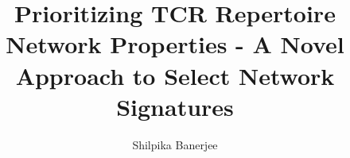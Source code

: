 \documentclass{sfsuthesis}
\begin{document}
\title{Prioritizing TCR Repertoire Network Properties - A Novel Approach to Select Network Signatures}
\author{Shilpika Banerjee}


\maketitle
\copyrightpage
\approvalpage




\begin{frontmatter}

%





\pagestyle{headings}
\begin{KeepFromToc}
  \tableofcontents
\end{KeepFromToc}
\clearpage
\listoftables
\clearpage
\listoffigures
\clearpage

\end{frontmatter}



\pagestyle{headings}
\end{document}
